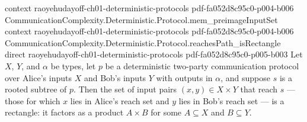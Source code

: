 \begin{theorem}
  {context}
  {raoyehudayoff-ch01-deterministic-protocols}
  {pdf-fa052d8c95c0-p004-b006}
\proofstep
  {CommunicationComplexity.Deterministic.Protocol.mem_preimageInputSet}
  {context}
  {raoyehudayoff-ch01-deterministic-protocols}
  {pdf-fa052d8c95c0-p004-b006}
\proofstep
  {CommunicationComplexity.Deterministic.Protocol.reachesPath_isRectangle}
  {direct}
  {raoyehudayoff-ch01-deterministic-protocols}
  {pdf-fa052d8c95c0-p005-b003}
Let $X$, $Y$, and $\alpha$ be types, let $p$ be a deterministic two-party communication
protocol over Alice's inputs $X$ and Bob's inputs $Y$ with outputs in $\alpha$, and
suppose $s$ is a rooted subtree of $p$. Then the set of input pairs $(x, y) \in X \times
Y$ that reach $s$ — those for which $x$ lies in Alice's reach set and $y$ lies in Bob's
reach set — is a rectangle: it factors as a product $A \times B$ for some $A \subseteq
X$ and $B \subseteq Y$.
\end{theorem}

